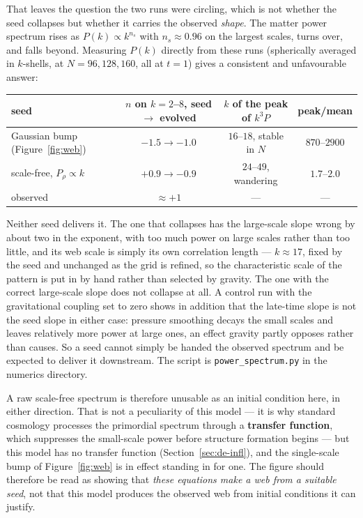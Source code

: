 \documentclass[11pt]{article}
\begin{document}
That leaves the question the two runs were circling, which is not whether the seed collapses but whether it
carries the observed \emph{shape}. The matter power spectrum rises as $P(k)\propto k^{n_s}$ with
$n_s\approx0.96$ on the largest scales, turns over, and falls beyond. Measuring $P(k)$ directly from these runs
(spherically averaged in $k$-shells, at $N=96,128,160$, all at $t=1$) gives a consistent and unfavourable answer:

\begin{center}
\small
\begin{tabular}{@{}lccc@{}}
\toprule
seed & $n$ on $k=2$--$8$, seed $\to$ evolved & $k$ of the peak of $k^3P$ & peak/mean\\
\midrule
Gaussian bump (Figure~\ref{fig:web}) & $-1.5\to-1.0$ & $16$--$18$, stable in $N$ & $870$--$2900$\\
scale-free, $P_\rho\propto k$ & $+0.9\to-0.9$ & $24$--$49$, wandering & $1.7$--$2.0$\\
\midrule
observed & $\approx+1$ & --- & ---\\
\bottomrule
\end{tabular}
\end{center}

\noindent Neither seed delivers it. The one that collapses has the large-scale slope wrong by about two in the
exponent, with too much power on large scales rather than too little, and its web scale is simply its own
correlation length --- $k\approx17$, fixed by the seed and unchanged as the grid is refined, so the characteristic
scale of the pattern is put in by hand rather than selected by gravity. The one with the correct large-scale slope
does not collapse at all. A control run with the gravitational coupling set to zero shows in addition that the
late-time slope is not the seed slope in either case: pressure smoothing decays the small scales and leaves
relatively more power at large ones, an effect gravity partly opposes rather than causes. So a seed cannot simply
be handed the observed spectrum and be expected to deliver it downstream. The script is
\texttt{power\_spectrum.py} in the numerics directory.

A raw scale-free spectrum is therefore unusable as an initial condition here, in either direction. That is not a
peculiarity of this model --- it is why standard cosmology processes the primordial spectrum through a
\textbf{transfer function}, which suppresses the small-scale power before structure formation begins --- but this
model has no transfer function (Section~\ref{sec:de-infl}), and the single-scale bump of Figure~\ref{fig:web} is
in effect standing in for one. The figure should therefore be read as showing that \emph{these equations make a web
from a suitable seed}, not that this model produces the observed web from initial conditions it can justify.
\end{document}
